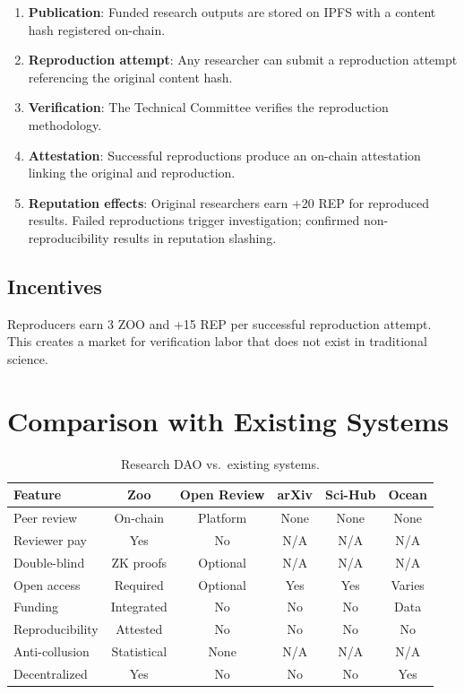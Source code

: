 \documentclass[11pt,letterpaper]{article}
\begin{document}
\begin{enumerate}
    \item \textbf{Publication}: Funded research outputs are stored on IPFS with a content hash registered on-chain.
    \item \textbf{Reproduction attempt}: Any researcher can submit a reproduction attempt referencing the original content hash.
    \item \textbf{Verification}: The Technical Committee verifies the reproduction methodology.
    \item \textbf{Attestation}: Successful reproductions produce an on-chain attestation linking the original and reproduction.
    \item \textbf{Reputation effects}: Original researchers earn +20 REP for reproduced results. Failed reproductions trigger investigation; confirmed non-reproducibility results in reputation slashing.
\end{enumerate}

\subsection{Incentives}

Reproducers earn 3 ZOO and +15 REP per successful reproduction attempt. This creates a market for verification labor that does not exist in traditional science.

\section{Comparison with Existing Systems}
\label{sec:comparison}

\begin{table}[h]
\centering
\caption{Research DAO vs.\ existing systems.}
\label{tab:compare}
\begin{tabular}{p{2.5cm}ccccc}
\toprule
\textbf{Feature} & \textbf{Zoo} & \textbf{Open Review} & \textbf{arXiv} & \textbf{Sci-Hub} & \textbf{Ocean} \\
\midrule
Peer review & On-chain & Platform & None & None & None \\
Reviewer pay & Yes & No & N/A & N/A & N/A \\
Double-blind & ZK proofs & Optional & N/A & N/A & N/A \\
Open access & Required & Optional & Yes & Yes & Varies \\
Funding & Integrated & No & No & No & Data \\
Reproducibility & Attested & No & No & No & No \\
Anti-collusion & Statistical & None & N/A & N/A & N/A \\
Decentralized & Yes & No & No & No & Yes \\
\bottomrule
\end{tabular}
\end{table}
\end{document}
